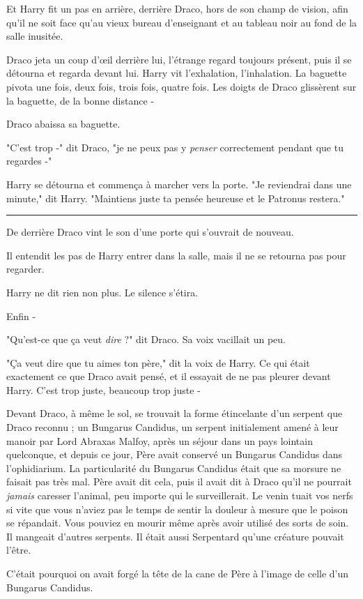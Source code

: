 Et Harry fit un pas en arrière, derrière Draco, hors de son champ de vision, afin qu'il ne soit face qu'au vieux bureau d'enseignant et au tableau noir au fond de la salle inusitée.

Draco jeta un coup d'œil derrière lui, l'étrange regard toujours présent, puis il se détourna et regarda devant lui. Harry vit l'exhalation, l'inhalation. La baguette pivota une fois, deux fois, trois fois, quatre fois. Les doigts de Draco glissèrent sur la baguette, de la bonne distance -

Draco abaissa sa baguette.

"C'est trop -" dit Draco, "je ne peux pas y \emph{penser } correctement pendant que tu regardes -"

Harry se détourna et commença à marcher vers la porte. "Je reviendrai dans une minute," dit Harry. "Maintiens juste ta pensée heureuse et le Patronus restera."
\par\noindent\rule{\textwidth}{0.4pt}
De derrière Draco vint le son d'une porte qui s'ouvrait de nouveau.

Il entendit les pas de Harry entrer dans la salle, mais il ne se retourna pas pour regarder.

Harry ne dit rien non plus. Le silence s'étira.

Enfin -

"Qu'est-ce que ça veut \emph{dire}  ?" dit Draco. Sa voix vacillait un peu.

"Ça veut dire que tu aimes ton père," dit la voix de Harry. Ce qui était exactement ce que Draco avait pensé, et il essayait de ne pas pleurer devant Harry. C'est trop juste, beaucoup trop juste -

Devant Draco, à même le sol, se trouvait la forme étincelante d'un serpent que Draco reconnu ; un Bungarus Candidus, un serpent initialement amené à leur manoir par Lord Abraxas Malfoy, après un séjour dans un pays lointain quelconque, et depuis ce jour, Père avait conservé un Bungarus Candidus dans l'ophidiarium. La particularité du Bungarus Candidus était que sa morsure ne faisait pas très mal. Père avait dit cela, puis il avait dit à Draco qu'il ne pourrait \emph{jamais}  caresser l'animal, peu importe qui le surveillerait. Le venin tuait vos nerfs si vite que vous n'aviez pas le temps de sentir la douleur à mesure que le poison se répandait. Vous pouviez en mourir même après avoir utilisé des sorts de soin. Il mangeait d'autres serpents. Il était aussi Serpentard qu'une créature pouvait l'être.

C'était pourquoi on avait forgé la tête de la cane de Père à l'image de celle d'un Bungarus Candidus.

